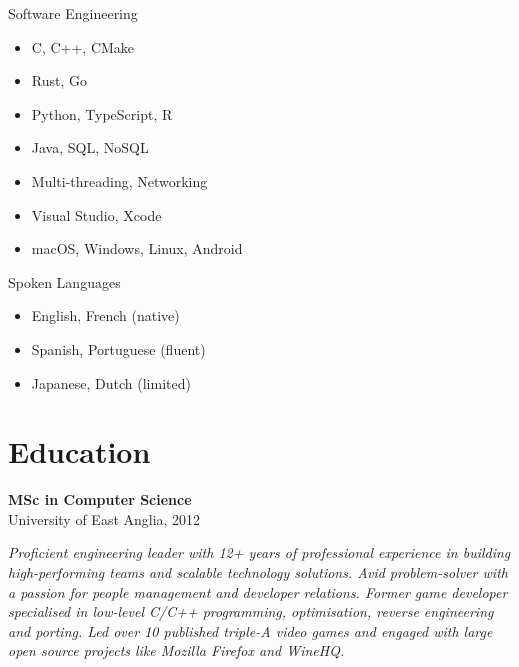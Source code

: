 \documentclass[a4paper,10pt]{article}
\newcommand{\subskill}[1]{{\color{vlightblue} #1}}
\begin{document}
{\begin{minipage}[t]{0.24\textwidth}
{\begin{minipage}[t][\textheight]{\dimexpr\textwidth-10pt}
        \subskill{Software Engineering}
        \begin{itemize}[leftmargin=1em, nosep]
            \item C, C++, CMake
            \item Rust, Go
            \item Python, TypeScript, R
            \item Java, SQL, NoSQL
            \item Multi-threading, Networking
            \item Visual Studio, Xcode
            \item macOS, Windows, Linux, Android
        \end{itemize}
        \vspace{0.5em}

        \subskill{Spoken Languages}
        \begin{itemize}[leftmargin=1em, nosep]
            \item English, French (native)
            \item Spanish, Portuguese (fluent)
            \item Japanese, Dutch (limited)
        \end{itemize}

        \section*{\color{lightblue} Education}
        \textbf{MSc in Computer Science} \\
        University of East Anglia, 2012
        \vfill %
    \end{minipage}%
    }
\end{minipage}%
\hfill%
\begin{minipage}[t]{0.72\textwidth}
    \hspace{-1.55em}
    \colorbox{headerbg}{%
    \begin{minipage}[t]{\dimexpr\textwidth + 0.65em}
        \vspace{0.5cm} %
        \textit{Proficient engineering leader with 12+ years of professional experience in building high-performing teams and scalable technology solutions. Avid problem-solver with a passion for people management and developer relations. Former game developer specialised in low-level C/C++ programming, optimisation, reverse engineering and porting. Led over 10 published triple-A video games and engaged with large open source projects like Mozilla Firefox and WineHQ.}
        \vspace{0.3cm}
    \end{minipage}%
    }

\end{minipage}}
\end{document}
